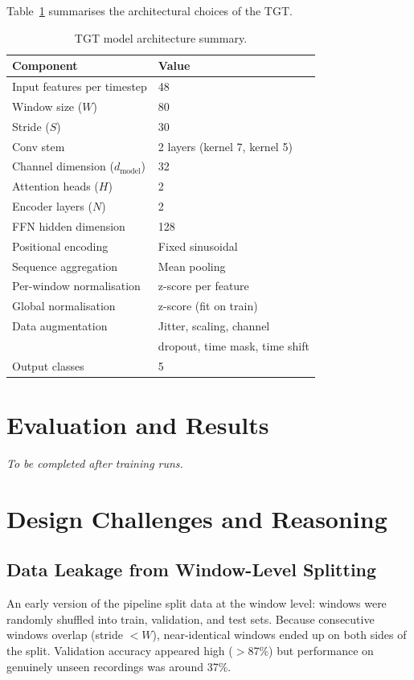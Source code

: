 \documentclass[11pt,a4paper,twocolumn]{article}
\begin{document}
Table~\ref{tab:model-params} summarises the architectural choices of the TGT.

\begin{table}[ht]
\centering
\small
\begin{tabular}{ll}
\toprule
\textbf{Component} & \textbf{Value} \\
\midrule
Input features per timestep & 48 \\
Window size ($W$) & 80 \\
Stride ($S$) & 30 \\
Conv stem & 2 layers (kernel 7, kernel 5) \\
Channel dimension ($d_{\text{model}}$) & 32 \\
Attention heads ($H$) & 2 \\
Encoder layers ($N$) & 2 \\
FFN hidden dimension & 128 \\
Positional encoding & Fixed sinusoidal \\
Sequence aggregation & Mean pooling \\
Per-window normalisation & z-score per feature \\
Global normalisation & z-score (fit on train) \\
Data augmentation & Jitter, scaling, channel \\
 & dropout, time mask, time shift \\
Output classes & 5 \\
\bottomrule
\end{tabular}
\caption{TGT model architecture summary.}
\label{tab:model-params}
\end{table}

\section{Evaluation and Results}

\textit{To be completed after training runs.}


\section{Design Challenges and Reasoning}

\subsection{Data Leakage from Window-Level Splitting}

An early version of the pipeline split data at the window level: windows were randomly shuffled into train, validation, and test sets. Because consecutive windows overlap (stride $< W$), near-identical windows ended up on both sides of the split. Validation accuracy appeared high ($>$87\%) but performance on genuinely unseen recordings was around 37\%.
\end{document}
